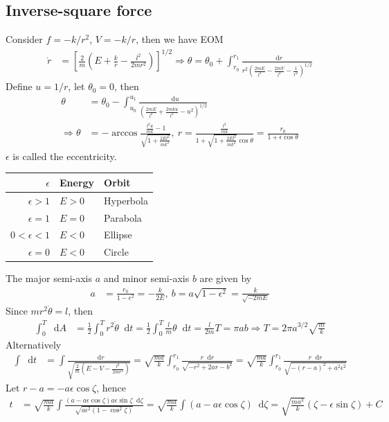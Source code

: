 \documentclass[twoside,9pt]{article}
\numberwithin{equation}{section} %
\renewcommand*\d{\mathop{}\!\mathrm{d}}
\theoremstyle{definition}
\theoremstyle{remark}
\begin{document}
\subsection{Inverse-square force}
Consider $f=-k/r^2$, $V=-k/r$,
then we have EOM
\begin{align}
    \dot r &= \left[
        \frac{2}{m}\left(E + \frac{k}{r} - \frac{l^2}{2mr^2}\right)
    \right]^{1/2}
    \Rightarrow
    \theta = \theta_0 + \int_{r_0}^{r_1}\frac{\d r}{r^2\left(
        \frac{2mE}{l^2} - \frac{2mV}{l^2} - \frac{1}{r^2}
    \right)^{1/2}}
\end{align}
Define $u=1/r$, let $\theta_0=0$, then
\begin{align}
    \theta &= \theta_0 - \int_{u_0}^{u_1}\frac{\d u}{
        \left(
            \frac{2mE}{l^2} + \frac{2mku}{l^2} - u^2
        \right)^{1/2}
    }\\
    \Rightarrow
    \theta &= -\arccos\frac{\frac{l^2u}{mk} - 1}{\sqrt{1 + \frac{2El^2}{mk^2}}},~
    r = \frac{\frac{l^2}{mk}}{1 + \sqrt{1 + \frac{2El^2}{mk^2}}\cos\theta}
    = \frac{r_0}{1 + \epsilon\cos\theta}
\end{align}
$\epsilon$ is called the eccentricity.
\begin{table}[H]
    \centering
    \begin{tabular}{rll}
        \toprule
        $\epsilon$ & Energy & Orbit\\
        \midrule
        $\epsilon>1$ & $E>0$ & Hyperbola\\
        $\epsilon=1$ & $E=0$ & Parabola\\
        $0 < \epsilon<1$ & $E<0$ & Ellipse\\
        $\epsilon=0$ & $E<0$ & Circle\\
        \bottomrule
    \end{tabular}
\end{table}
The major semi-axis $a$ and minor semi-axis $b$ are given by
\begin{align}
    a &= \frac{r_0}{1 - \epsilon^2} = -\frac{k}{2E},~
    b = a\sqrt{1 - \epsilon^2} = \frac{k}{\sqrt{-2mE}}
\end{align}
Since $mr^2\dot\theta = l$, then
\begin{align}
    \int_0^T\d A &= 
    \frac{1}{2}\int_0^T r^2\dot\theta\d t 
    = \frac{1}{2}\int_0^T \frac{l}{m}\theta\d t
    = \frac{l}{2m}T = \pi ab\Rightarrow
    T = 2\pi a^{3/2}\sqrt{\frac{m}{k}}
\end{align}
Alternatively
\begin{align}
    \int \d t &= 
    \int \frac{\d r}{\sqrt{\frac{2}{m}\left(
        E - V - \frac{l^2}{2mr^2}
    \right)}}
    = \sqrt{\frac{ma}{k}}\int_{r_0}^{r_1}
    \frac{r\d r}{\sqrt{-r^2 + 2ar - b^2}}
    = \sqrt{\frac{ma}{k}}\int_{r_0}^{r_1}
    \frac{r\d r}{\sqrt{-(r-a)^2 + a^2\epsilon^2}}
\end{align}
Let $r-a = -a\epsilon\cos\zeta$, hence
\begin{align}
    t &= \sqrt{\frac{ma}{k}}
    \int\frac{(a-a\epsilon\cos\zeta)a\epsilon\sin\zeta\d\zeta}{\sqrt{
        a\epsilon^2(1-\cos^2\zeta)
    }}
    = \sqrt{\frac{ma}{k}}\int  (a-a\epsilon\cos\zeta)\d\zeta
    = \sqrt{\frac{ma^3}{k}}(\zeta -\epsilon\sin\zeta ) + C
\end{align}
\end{document}
